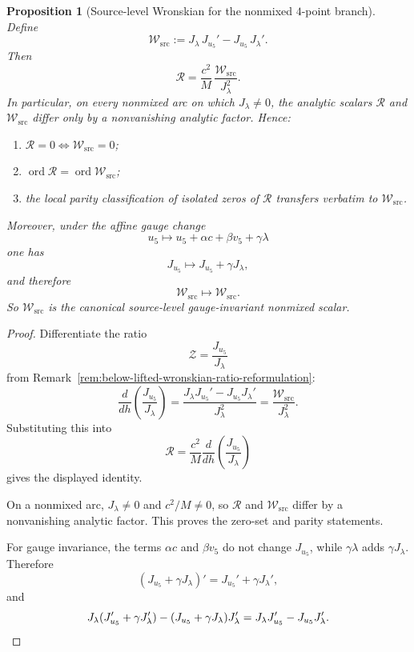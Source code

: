\documentclass[11pt,a4paper]{amsart}
\theoremstyle{plain}
\newtheorem{proposition}[theorem]{Proposition}
\theoremstyle{definition}
\begin{document}
\begin{proposition}[Source-level Wronskian for the nonmixed $4$-point branch]
\label{prop:source-level-Wronskian-nonmixed-four-point}
Define
\[
\mathcal W_{\mathrm{src}}
:=
J_{\lambda}\,J_{u_5}'-J_{u_5}\,J_{\lambda}'.
\]
Then
\[
\boxed{
\mathcal R
=
\frac{c^2}{M}\,\frac{\mathcal W_{\mathrm{src}}}{J_\lambda^2}.
}
\]
In particular, on every nonmixed arc on which $J_\lambda\neq 0$, the analytic
scalars $\mathcal R$ and $\mathcal W_{\mathrm{src}}$ differ only by a
nonvanishing analytic factor. Hence:

\begin{enumerate}
\item $\mathcal R=0\iff \mathcal W_{\mathrm{src}}=0$;
\item $\operatorname{ord}\mathcal R=\operatorname{ord}\mathcal W_{\mathrm{src}}$;
\item the local parity classification of isolated zeros of $\mathcal R$
transfers verbatim to $\mathcal W_{\mathrm{src}}$.
\end{enumerate}

Moreover, under the affine gauge change
\[
u_5\longmapsto u_5+\alpha c+\beta v_5+\gamma \lambda
\]
one has
\[
J_{u_5}\longmapsto J_{u_5}+\gamma J_\lambda,
\]
and therefore
\[
\mathcal W_{\mathrm{src}}\longmapsto \mathcal W_{\mathrm{src}}.
\]
So $\mathcal W_{\mathrm{src}}$ is the canonical source-level gauge-invariant
nonmixed scalar.
\end{proposition}

\begin{proof}
Differentiate the ratio
\[
\mathcal Z=\frac{J_{u_5}}{J_\lambda}
\]
from Remark~\ref{rem:below-lifted-wronskian-ratio-reformulation}:
\[
\frac{d}{dh}\!\left(\frac{J_{u_5}}{J_\lambda}\right)
=
\frac{J_\lambda J_{u_5}'-J_{u_5}J_\lambda'}{J_\lambda^2}
=
\frac{\mathcal W_{\mathrm{src}}}{J_\lambda^2}.
\]
Substituting this into
\[
\mathcal R
=
\frac{c^2}{M}\frac{d}{dh}\!\left(\frac{J_{u_5}}{J_\lambda}\right)
\]
gives the displayed identity.

On a nonmixed arc, $J_\lambda\neq 0$ and $c^2/M\neq 0$, so $\mathcal R$
and $\mathcal W_{\mathrm{src}}$ differ by a nonvanishing analytic factor.
This proves the zero-set and parity statements.

For gauge invariance, the terms $\alpha c$ and $\beta v_5$ do not change
$J_{u_5}$, while $\gamma\lambda$ adds $\gamma J_\lambda$. Therefore
\[
(J_{u_5}+\gamma J_\lambda)'=J_{u_5}'+\gamma J_\lambda',
\]
and
\[
J_\lambda(J_{u_5}'+\gamma J_\lambda')-(J_{u_5}+\gamma J_\lambda)J_\lambda'
=
J_\lambda J_{u_5}'-J_{u_5}J_\lambda'.
\qedhere
\]
\end{proof}
\end{document}
